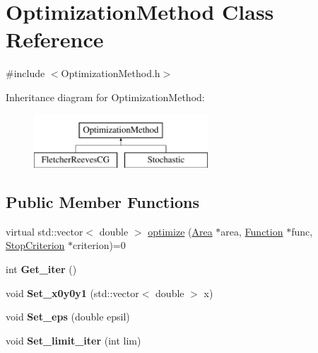 \hypertarget{class_optimization_method}{}\section{Optimization\+Method Class Reference}
\label{class_optimization_method}


{\ttfamily \#include $<$Optimization\+Method.\+h$>$}

Inheritance diagram for Optimization\+Method\+:\begin{figure}[H]
\begin{center}
\leavevmode
\includegraphics[height=2.000000cm]{class_optimization_method}
\end{center}
\end{figure}
\subsection*{Public Member Functions}
\begin{DoxyCompactItemize}
\item 
virtual std\+::vector$<$ double $>$ \mbox{\hyperlink{class_optimization_method_a63dd17c00593363a017c8dd440770aa2}{optimize}} (\mbox{\hyperlink{class_area}{Area}} $\ast$area, \mbox{\hyperlink{class_function}{Function}} $\ast$func, \mbox{\hyperlink{class_stop_criterion}{Stop\+Criterion}} $\ast$criterion)=0
\item 
\mbox{\label{class_optimization_method_a8848ef8edd0cf5f7b8d28e3d91489c73}} 
int {\bfseries Get\+\_\+iter} ()
\item 
\mbox{\label{class_optimization_method_a4be709579f631e714fe8dc143a42e772}} 
void {\bfseries Set\+\_\+x0y0y1} (std\+::vector$<$ double $>$ x)
\item 
\mbox{\label{class_optimization_method_a50af095f319048fad7a38ea0140ec841}} 
void {\bfseries Set\+\_\+eps} (double epsil)
\item 
\mbox{\label{class_optimization_method_aa66a2635f80201526d6a17c2d0766c97}} 
void {\bfseries Set\+\_\+limit\+\_\+iter} (int lim)
\end{DoxyCompactItemize}
